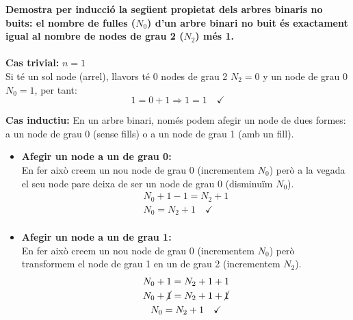 \documentclass[11pt]{article}
\begin{document}
\textbf{Demostra per inducció la següent propietat dels arbres binaris no buits: el
nombre de fulles ($N_0$) d’un arbre binari no buit és exactament igual al nombre
de nodes de grau 2 ($N_2$) més 1.}
\begingroup
    \\[0.25cm]
\endgroup
\\
\textbf{Cas trivial:} $n = 1$\\
Si té un sol node (arrel), llavors té 0 nodes de grau 2 $N_2 = 0$ y un node de grau 0 $N_0 = 1$, per tant:
\[1 = 0 + 1 \Longrightarrow 1 = 1 \quad\checkmark\]

\textbf{Cas inductiu:} En un arbre binari, només podem afegir un node de dues formes: a un node de grau 0 (sense fills) o a un node de grau 1 (amb un fill).\\
    \begin{itemize}
        \item\textbf{Afegir un node a un de grau 0:}\\
            En fer això creem un nou node de grau 0 (incrementem $N_0$) però a la vegada el seu node pare deixa de ser un node de grau 0 (disminuïm $N_0$).
            \begin{gather*}
                N_0+1-1 = N_2 + 1\\
                N_0 = N_2 +1 \quad \checkmark\\
            \end{gather*}
        \item \textbf{Afegir un node a un de grau 1:}\\
             En fer això creem un nou node de grau 0 (incrementem $N_0$) però transformem el node de grau 1 en un de grau 2 (incrementem $N_2$).
            \begin{gather*}
                N_0+1 = N_2 + 1 + 1\\
                N_0 +\cancel{1} = N_2 + 1 +\cancel{ 1}\\
                N_0 = N_2 +1 \quad \checkmark\\
            \end{gather*}
    \end{itemize}
\end{document}
